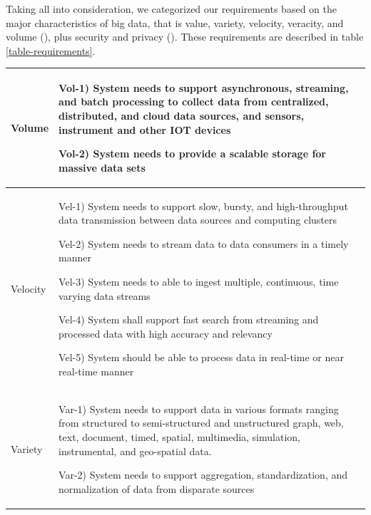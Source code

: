 \documentclass[conference]{IEEEtran}
\begin{document}
Taking all into consideration, we categorized our requirements based on the major characteristics of big data, that is value, variety, velocity, veracity, and volume (\cite{rada2017hype}), plus security and privacy (\cite{bashari2016security}). These requirements are described in table \ref{table-requirements}.

\begin{center}
    \begin{table}[h]
    \renewcommand*{\arraystretch}{1.8}
    \begin{tabular}{ | m{1.2cm} | m{14cm} |}

        \hline

        Volume &

        Vol-1) System needs to support asynchronous, streaming, and batch processing to collect data from centralized, distributed, and cloud data sources, and sensors, instrument and other IOT devices 
        
        Vol-2) System needs to provide a scalable storage for massive data sets 
 
        \\

        \hline

        Velocity & 
        
        Vel-1) System needs to support slow, bursty, and high-throughput data transmission between data sources and computing clusters
        
        Vel-2) System needs to stream data to data consumers in a timely manner 

        Vel-3) System needs to able to ingest multiple, continuous, time varying data streams 

        Vel-4) System shall support fast search from streaming and processed data with high accuracy and relevancy 
        
        Vel-5) System should be able to process data in real-time or near real-time manner 
    
        \\ 

        \hline

        Variety & 

        Var-1) System needs to support data in various formats ranging from structured to semi-structured and unstructured graph, web, text, document, timed, spatial, multimedia, simulation, instrumental, and geo-spatial data. 

        Var-2) System needs to support aggregation, standardization, and normalization of data from disparate sources 


\end{tabular}
\end{table}
\end{center}
\end{document}
